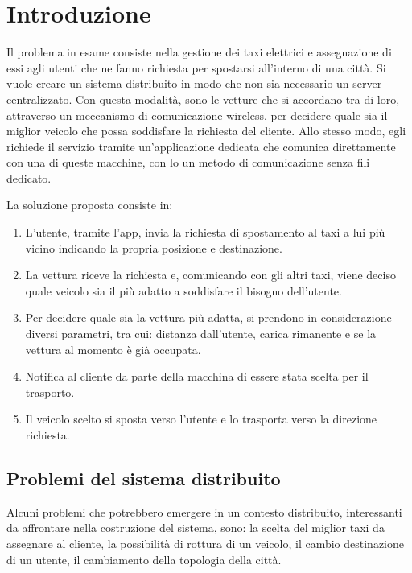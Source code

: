 
\chapter{Introduzione}

Il problema in esame consiste nella gestione dei taxi elettrici e assegnazione di essi agli utenti che ne fanno richiesta per spostarsi all'interno di una città. Si vuole creare un sistema distribuito in modo che non sia necessario un server centralizzato. Con questa modalità, sono le vetture che si accordano tra di loro, attraverso un meccanismo di comunicazione wireless, per decidere quale sia il miglior veicolo che possa soddisfare la richiesta del cliente. Allo stesso modo, egli richiede il servizio tramite un'applicazione dedicata che comunica direttamente con una di queste macchine, con lo un metodo di comunicazione senza fili dedicato. 

La soluzione proposta consiste in:
\begin{enumerate}
	\item L'utente, tramite l'app, invia la richiesta di spostamento al taxi a lui più vicino indicando la propria posizione e destinazione.
	\item La vettura riceve la richiesta e, comunicando con gli altri taxi, viene deciso quale veicolo sia il più adatto a soddisfare il bisogno dell'utente.
	\item Per decidere quale sia la vettura più adatta, si prendono in considerazione diversi parametri, tra cui: distanza dall'utente, carica rimanente e se la vettura al momento è già occupata.
	\item Notifica al cliente da parte della macchina di essere stata scelta per il trasporto.
	\item Il veicolo scelto si sposta verso l'utente e lo trasporta verso la direzione richiesta.
\end{enumerate}

\newpage

\section{Problemi del sistema distribuito} \label{problematiche_distribuite}

Alcuni problemi che potrebbero emergere in un contesto distribuito, interessanti da affrontare nella costruzione del sistema, sono: la scelta del miglior taxi da assegnare al cliente, la possibilità di rottura di un veicolo, il cambio destinazione di un utente, il cambiamento della topologia della città.

